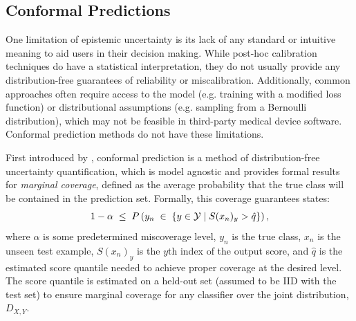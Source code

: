 \documentclass[letterpaper]{article} %
\begin{document}
    \subsection{Conformal Predictions}

        One limitation of epistemic uncertainty is its lack of any standard or intuitive meaning to aid users in their decision making.
        While post-hoc calibration techniques do have a statistical interpretation, they do not usually provide any distribution-free guarantees of reliability or miscalibration.
        Additionally, common approaches often require access to the model (e.g. training with a modified loss function) or distributional assumptions (e.g. sampling from a Bernoulli distribution), which may not be feasible in third-party medical device software.
        Conformal prediction methods do not have these limitations.

        First introduced by \citet{vovk}, conformal prediction is a method of distribution-free uncertainty quantification, which is model agnostic and provides formal results for \textit{marginal coverage}, defined as the average probability that the true class will be contained in the prediction set.
        Formally, this coverage guarantees states:
        \begin{equation}
            \small
            1 - \alpha \; \leq \; P\left(y_n \; \in \; \left\{y \in \mathcal{Y} \mid S(x_n)_y > \hat{q} \right\} \right),
        \end{equation}
        where $\alpha$ is some predetermined miscoverage level, $y_n$ is the true class, $x_n$ is the unseen test example, $S(x_n)_y$ is the $y$th index of the output score, and $\hat{q}$ is the estimated score quantile needed to achieve proper coverage at the desired level.
        The score quantile is estimated on a held-out set (assumed to be IID with the test set) to ensure marginal coverage for any classifier over the joint distribution, $D_{X, Y}$.
\end{document}
